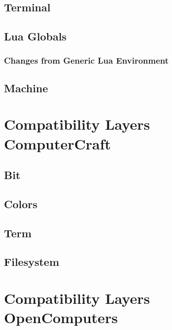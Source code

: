 \documentclass[10pt, stock]{memoir}
\let\oldsection\section
\renewcommand\section{\clearpage\oldsection}
\begin{document}
\section{Terminal}


\section{Lua Globals}

\subsection{Changes from Generic Lua Environment}


\section{Machine}



\chapter[Compatibility Layers---ComputerCraft]{{\LARGE Compatibility Layers} \\ ComputerCraft}

\section{Bit}


\section{Colors}


\section{Term}

\section{Filesystem}



\chapter[Compatibility Layers---OpenComputers]{{\LARGE Compatibility Layers} \\ OpenComputers}
\end{document}
